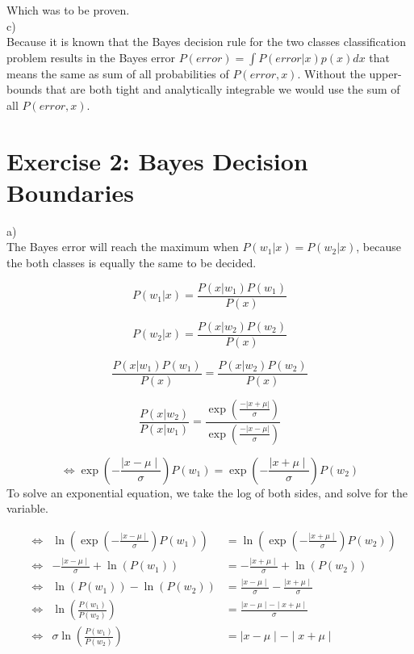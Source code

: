 \documentclass[a4paper]{article}
\begin{document}
Which was to be proven.\\

c)\\
Because it is known that the Bayes decision rule for the two classes classification problem results in the Bayes error $ P(error) = \int P(error|x)p(x) dx$ that means the same as sum of all probabilities of $P(error, x).$ Without the upper-bounds that are both tight and analytically integrable we would use the sum of all $P(error, x).$

\section{Exercise 2: Bayes Decision Boundaries}
a)\\
The Bayes error will reach the maximum when $P(w_{1}|x) = P(w_{2}|x)$, because the both classes is equally the same to be decided.  

$$P(w_{1}|x) = \frac{P(x|w_{1})P(w_{1})}{P(x)} $$ 

$$ P(w_{2}|x) =  \frac{P(x|w_{2})P(w_{2})}{P(x)}$$

$$\frac{P(x|w_{1})P(w_{1})}{P(x)} = \frac{P(x|w_{2})P(w_{2})}{P(x)}$$

$$\frac{P(x|w_{2})}{P(x|w_{1})} = \frac{\exp{(\frac{-|x + \mu|}{\sigma})}}{\exp{(\frac{-|x - \mu|}{\sigma})}}$$ 

$$\Leftrightarrow \exp\left(-\frac{\mid x - \mu \mid}{\sigma}\right)P(w_1) = \exp\left(-\frac{\mid x + \mu \mid}{\sigma}\right)P(w_2) $$
To solve an exponential equation, we take the log of both sides, and solve for the variable.

\begin{align*}
&\Leftrightarrow &\ln(\exp\left(-\frac{\mid x - \mu \mid}{\sigma}\right)P(w_1)) &= \ln(\exp\left(-\frac{\mid x + \mu \mid}{\sigma}\right)P(w_2)) \\
&\Leftrightarrow &-\frac{\mid x - \mu \mid}{\sigma} + \ln(P(w_1)) &= -\frac{\mid x + \mu \mid}{\sigma} + \ln(P(w_2)) \\
&\Leftrightarrow & \ln(P(w_1)) - \ln(P(w_2)) &= \frac{\mid x - \mu \mid}{\sigma} - \frac{\mid x + \mu \mid}{\sigma} \\
&\Leftrightarrow & \ln\left(\frac{P(w_1)}{P(w_2)}\right) &= \frac{\mid x - \mu \mid - \mid x + \mu \mid}{\sigma} \\
&\Leftrightarrow & \sigma\ln\left(\frac{P(w_1)}{P(w_2)}\right) &= \mid x - \mu \mid - \mid x + \mu \mid
\end{align*}
\end{document}
